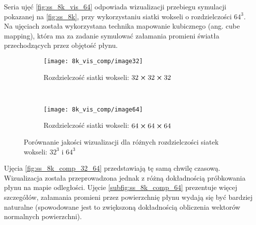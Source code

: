 \par
Seria ujęć \eqref{fig:ss_8k_vis_64} odpowiada wizualizacji przebiegu symulacji pokazanej na \eqref{fig:ss_8k}, przy wykorzystaniu siatki wokseli o rozdzielczości $64^3$. Na ujęciach została wykorzystana technika mapowanie kubicznego (ang. cube mapping), która ma za zadanie symulować załamania promieni światła przechodzących przez objętość płynu.

\begin{figure}[H]
\centering     %

\begin{subfigure}[b]{0.80\textwidth}
\texttt{[image: 8k\_vis\_comp/image32]}%
\caption{Rozdzielczość siatki wokseli: $32\cross32\cross32$}
\label{subfig:ss_8k_comp_32}
\end{subfigure}
\\
\vspace{1em}
\begin{subfigure}[b]{0.80\textwidth}
\texttt{[image: 8k\_vis\_comp/image64]}%
\caption{Rozdzielczość siatki wokseli: $64\cross64\cross64$}
\label{subfig:ss_8k_comp_64}
\end{subfigure}

\caption{Porównanie jakości wizualizacji dla różnych rozdzielczości siatek wokseli: $32^3$ i $64^3$}
\label{fig:ss_8k_comp_32_64}
\end{figure}

\par
Ujęcia \eqref{fig:ss_8k_comp_32_64} przedstawiają tę samą chwilę czasową. Wizualizacja została przeprowadzona jednak z różną dokładnością próbkowania płynu na mapie odległości. Ujęcie \eqref{subfig:ss_8k_comp_64} prezentuje więcej szczegółów, załamania promieni przez powierzchnię płynu wydają się być bardziej naturalne (spowodowane jest to zwiększoną dokładnością obliczenia wektorów normalnych powierzchni).
\par

